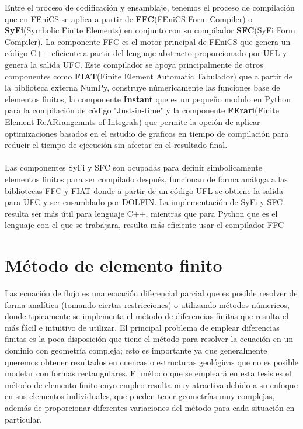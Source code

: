 Entre el proceso de codificación y ensamblaje, tenemos el proceso de compilación que en FEniCS se aplica a partir de \textbf{FFC}(FEniCS Form Compiler) o \textbf{SyFi}(Symbolic Finite Elements) en conjunto con su compilador \textbf{SFC}(SyFi Form Compiler). La componente FFC es el motor principal de FEniCS que genera un código C++ eficiente a partir del lenguaje abstracto proporcionado por UFL y genera la salida UFC. Este compilador se apoya principalmente de otros componentes como \textbf{FIAT}(Finite Element Automatic Tabulador) que a partir de la biblioteca externa NumPy, construye númericamente las funciones base de elementos finitos, la componente \textbf{Instant} que es un pequeño modulo en Python para la compilación de código "Just-in-time" y la componente \textbf{FErari}(Finite Element ReARrangemnts of Integrals) que permite la opción de aplicar optimizaciones basados en el estudio de graficos en tiempo de compilación para reducir el tiempo de ejecución sin afectar en el resultado final.
\\
\\
Las componentes SyFi y SFC son ocupadas para definir simbolicamente elementos finitos para ser compilado después, funcionan de forma análoga a las bibliotecas FFC y FIAT donde a partir de un código UFL se obtiene la salida para UFC y ser ensamblado por DOLFIN. La implementación de SyFi y SFC resulta ser más útil para lenguaje C++, mientras que para Python que es el lenguaje con el que se trabajara, resulta más eficiente usar el compilador FFC \cite{Perez2018}


\section{Método de elemento finito}

Las ecuación de flujo es una ecuación diferencial parcial que es posible resolver de forma analítica (tomando ciertas restricciones) o utilizando métodos númericos, donde tipicamente se implementa el método de diferencias finitas que resulta el más fácil e intuitivo de utilizar. El principal problema de emplear diferencias finitas es la poca disposición que tiene el método para resolver la ecuación en un dominio con geometría compleja; esto es importante ya que generalmente queremos obtener resultados en cuencas o estructuras geológicas que no es posible modelar con formas rectangulares. El método que se empleará en esta tesis es el método de elemento finito cuyo empleo resulta muy atractiva debido a su enfoque en sus elementos individuales, que pueden tener geometrías muy complejas, además de proporcionar diferentes variaciones del método para cada situación en particular.
\\

